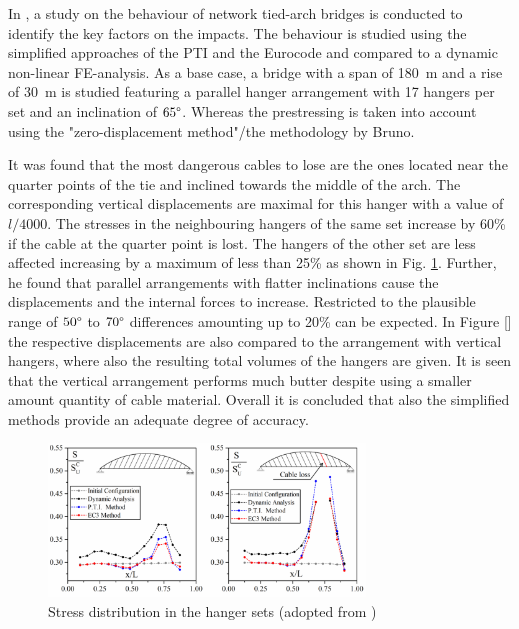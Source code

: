 In \citep{Bruno}, a study on the behaviour of network tied-arch bridges is conducted to identify the key factors on the impacts. The behaviour is studied using the simplified approaches of the PTI and the Eurocode and compared to a dynamic non-linear FE-analysis. As a base case, a bridge with a span of \SI{180}{m} and a rise of \SI{30}{m} is studied featuring a parallel hanger arrangement with 17 hangers per set and an inclination of $65 \degree$. Whereas the prestressing is taken into account using the "zero-displacement method"/the methodology by Bruno.

It was found that the most dangerous cables to lose are the ones located near the quarter points of the tie and inclined towards the middle of the arch. The corresponding vertical displacements are maximal for this hanger with a value of $l/4000$. The stresses in the neighbouring hangers of the same set increase by 60\% if the cable at the quarter point is lost. The hangers of the other set are less affected increasing by a maximum of less than 25\% as shown in Fig. \ref{fig:Bruno}. Further, he found that parallel arrangements with flatter inclinations cause the displacements and the internal forces to increase. Restricted to the plausible range of $50\degree$ to $70\degree$ differences amounting up to 20\% can be expected. In Figure [] the respective displacements are also compared to the arrangement with vertical hangers, where also the resulting total volumes of the hangers are given. It is seen that the vertical arrangement performs much butter despite using a smaller amount quantity of cable material. Overall it is concluded that also the simplified methods provide an adequate degree of accuracy.

\begin{figure}[H]
    \centering
    \includegraphics[width=0.75\textwidth]{Pictures/BrunoCableLoss.PNG}
    \caption{Stress distribution in the hanger sets (adopted from \citep{Bruno})}
    \label{fig:Bruno}
\end{figure}

